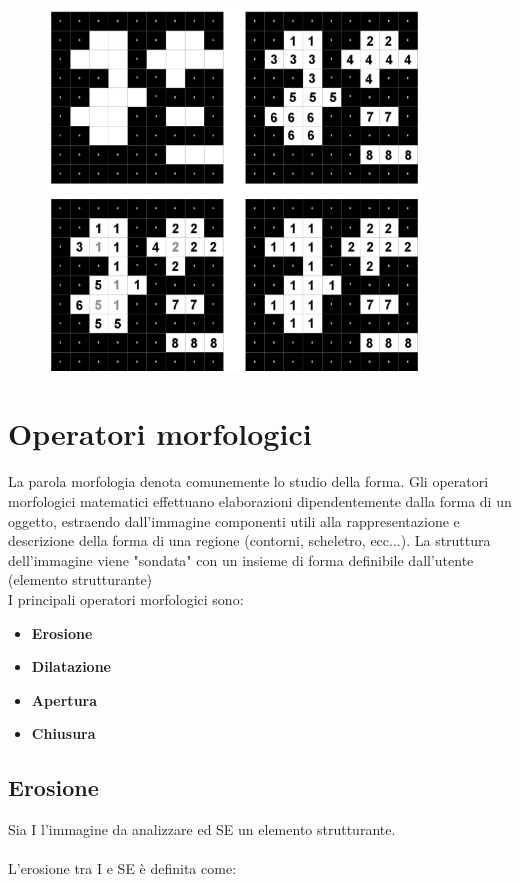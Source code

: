 \begin{figure}[H]
    \centering
    \includegraphics[width=10cm, keepaspectratio]{capitoli/immagini/imgs/fuzzy-selection.png}
\end{figure}

\newpage
\section{Operatori morfologici}

La parola morfologia denota comunemente lo studio della forma.
Gli operatori morfologici matematici effettuano elaborazioni dipendentemente dalla forma di un oggetto, estraendo
dall'immagine componenti utili alla rappresentazione e descrizione della forma di una regione (contorni, scheletro, ecc...).
La struttura dell'immagine viene "sondata" con un insieme di forma definibile dall'utente (elemento strutturante)
\\ I principali operatori morfologici sono:

\begin{itemize}
    \item \textbf{Erosione}
    \item \textbf{Dilatazione}
    \item \textbf{Apertura}
    \item \textbf{Chiusura}
\end{itemize}

\newpage
\subsection{Erosione}

Sia I l'immagine da analizzare ed SE un elemento strutturante.
\\\\
L'erosione tra I e SE è definita come:

